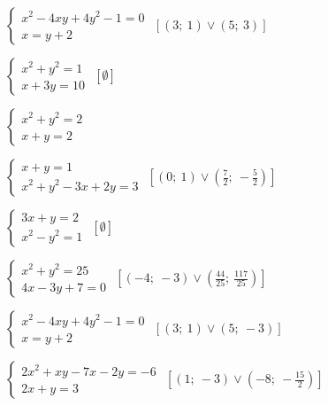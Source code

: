 \begin{esercizio}[\Ast]
\begin{multicols}{2}
\begin{enumeratea}
 \item~$\left\{\begin{array}{l}x^2-4xy+4y^2-1=0\\x=y+2\end{array}\right.$
\hfill$\left[\left(3;~1\right)\vee \left(5;~3\right)\right]$
 \item~$\left\{\begin{array}{l}x^2+y^2=1\\x+3y=10\end{array}\right.$
\hfill$\left[\emptyset\right]$
 \item~$\left\{\begin{array}{l}x^2+y^2=2\\x+y=2\end{array}\right.$
 \item~$\left\{\begin{array}{l}x+y=1\\x^2+y^2-3x+2y=3\end{array}\right.$
\hfill$\left[\left(0;~1\right)\vee \left(\frac 7 2;~-\frac 5 2\right)\right]$
 \item~$\left\{\begin{array}{l}3x+y=2\\x^2-y^2=1\end{array}\right.$
\hfill$\left[\emptyset\right]$
 \item~$\left\{\begin{array}{l}x^2+y^2=25\\4x-3y+7=0\end{array}\right.$
\hfill$\left[\left(-4;~-3\right) \vee 
       \left(\frac{44}{25};~\frac{117}{25}\right)\right]$
 \item~$\left\{\begin{array}{l}x^2-4xy+4y^2-1=0\\x=y+2\end{array}\right.$
\hfill$\left[\left(3;~1\right)\vee \left(5;~-3\right)\right]$
 \item~$\left\{\begin{array}{l}2x^2+xy-7x-2y=-6\\2x+y=3\end{array}\right.$
\hfill$\left[\left(1;~-3\right)\vee \left(-8;~-\frac{15} 2\right)\right]$
 \end{enumeratea}
 \end{multicols}
\end{esercizio}

